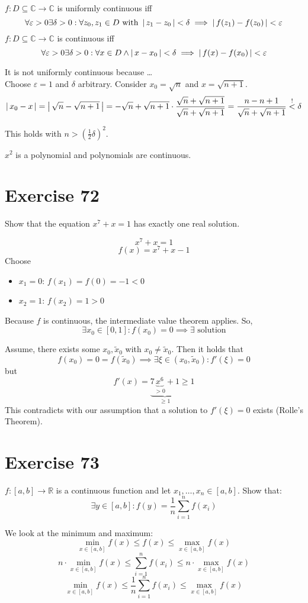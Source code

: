 \documentclass[a4paper]{article}
\theoremstyle{definition}
\newcommand\abs[1]{\left|\thinspace #1\thinspace\right|}
\begin{document}
$f: D \subseteq \mathbb C \to \mathbb C$ is uniformly continuous iff
\[
  \forall \varepsilon > 0 \exists \delta > 0:
  \forall z_0, z_1 \in D \text{ with } \abs{z_1 - z_0} < \delta
  \implies \abs{f(z_1) - f(z_0)} < \varepsilon
\]
$f: D \subseteq \mathbb C \to \mathbb C$ is continuous iff
\[
  \forall \varepsilon > 0 \exists \delta > 0: \forall x \in D
  \land \abs{x - x_0} < \delta \implies \abs{f(x) - f(x_0)} < \varepsilon
\]

It is not uniformly continuous because \dots \\
Choose $\varepsilon = 1$ and $\delta$ arbitrary.
Consider $x_0 = \sqrt{n}$ and $x = \sqrt{n + 1}$.
%
\[
  \abs{x_0 - x} = \abs{\sqrt{n} - \sqrt{n + 1}}
    = -\sqrt{n} + \sqrt{n + 1} \cdot \frac{\sqrt{n} + \sqrt{n+1}}{\sqrt{n} + \sqrt{n+1}}
    = \frac{n - n + 1}{\sqrt{n} + \sqrt{n + 1}}
    \overset{!}{<} \delta
\]

This holds with $n > \left(\frac12 \delta\right)^2$.

$x^2$ is a polynomial and polynomials are continuous.

\section{Exercise 72}
%
\begin{ex}
  Show that the equation $x^7 + x = 1$ has exactly one real solution.
\end{ex}
%
\[ x^7 + x = 1 \]
\[ f(x) = x^7 + x - 1 \]
%
Choose
\begin{itemize}
  \item $x_1 = 0$: $f(x_1) = f(0) = -1 < 0$
  \item $x_2 = 1$: $f(x_2) = 1 > 0$
\end{itemize}

Because $f$ is continuous, the intermediate value theorem applies. So,
\[ \exists x_0 \in [0,1]: f(x_0) = 0 \implies \exists \text{ solution} \]

Assume, there exists some $x_0, \tilde{x}_0$ with $x_0 \neq \tilde{x}_0$.
Then it holds that
\[ f(x_0) = 0 = f(\tilde{x}_0) \implies \exists \xi \in (x_0, \tilde{x}_0): f'(\xi) = 0 \]
but
\[ f'(x) = \underbrace{7\underbrace{x^6}_{>0} + 1}_{\geq 1} \geq 1 \]
This contradicts with our assumption that a solution to $f'(\xi) = 0$ exists (Rolle's Theorem).

\section{Exercise 73}
%
\begin{ex}
  $f: [a,b] \to \mathbb R$ is a continuous function and let $x_1, \ldots, x_n \in [a,b]$.
  Show that:
  \[ \exists y \in [a,b]: f(y) = \frac1n \sum_{i=1}^n f(x_i) \]
\end{ex}
%
We look at the minimum and maximum:
\[ \min_{x \in [a,b]} f(x) \leq f(x) \leq \max_{x \in [a,b]} f(x) \]
\[
  n \cdot \min_{x \in [a,b]} f(x) \leq \sum_{i=1}^n f(x_i) \leq n \cdot \max_{x \in [a,b]} f(x)
\] \[
  \min_{x \in [a,b]} f(x) \leq \frac1n \sum_{i=1}^n f(x_i) \leq \max_{x \in [a,b]} f(x)
\]
\end{document}
